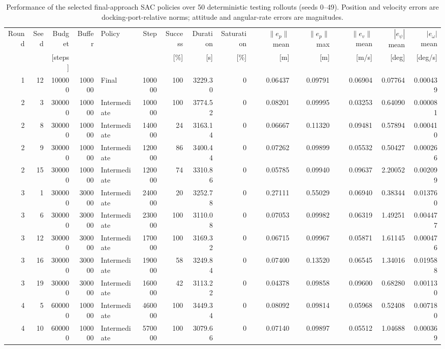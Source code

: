 \begin{table}[t]
\centering
\caption{Performance of the selected final-approach SAC policies over 50 deterministic testing rollouts (seeds 0--49). Position and velocity errors are docking-port-relative norms; attitude and angular-rate errors are magnitudes.}
\label{tab:selected-final-approach-sac-50}
\scriptsize
\setlength{\tabcolsep}{3pt}
\begin{tabular}{rrrrlrrrrrrrrr}
\hline
Round & Seed & Budget & Buffer & Policy & Step & Success & Duration & Saturation & $\|e_p\|$ mean & $\|e_p\|$ max & $\|e_v\|$ mean & $|e_\psi|$ mean & $|e_\omega|$ mean \\
 & & [steps] & & & & [\%] & [s] & [\%] & [m] & [m] & [m/s] & [deg] & [deg/s] \\
\hline
1 & 12 & 100000 & 100000 & Final & 100000 & 100 & 3229.30 & 0 & 0.06437 & 0.09791 & 0.06904 & 0.07764 & 0.000439 \\
2 & 3 & 300000 & 100000 & Intermediate & 100000 & 100 & 3774.52 & 0 & 0.08201 & 0.09995 & 0.03253 & 0.64090 & 0.000081 \\
2 & 8 & 300000 & 100000 & Intermediate & 140000 & 24 & 3163.14 & 0 & 0.06667 & 0.11320 & 0.09481 & 0.57894 & 0.000410 \\
2 & 9 & 300000 & 100000 & Intermediate & 120000 & 86 & 3400.44 & 0 & 0.07262 & 0.09899 & 0.05532 & 0.50427 & 0.000266 \\
2 & 15 & 300000 & 100000 & Intermediate & 120000 & 74 & 3310.86 & 0 & 0.05785 & 0.09940 & 0.09637 & 2.20052 & 0.002099 \\
3 & 1 & 300000 & 300000 & Intermediate & 240000 & 20 & 3252.78 & 0 & 0.27111 & 0.55029 & 0.06940 & 0.38344 & 0.013760 \\
3 & 6 & 300000 & 300000 & Intermediate & 230000 & 100 & 3110.08 & 0 & 0.07053 & 0.09982 & 0.06319 & 1.49251 & 0.004477 \\
3 & 12 & 300000 & 300000 & Intermediate & 170000 & 100 & 3169.32 & 0 & 0.06715 & 0.09967 & 0.05871 & 1.61145 & 0.000476 \\
3 & 16 & 300000 & 300000 & Intermediate & 190000 & 58 & 3249.84 & 0 & 0.07400 & 0.13520 & 0.06545 & 1.34016 & 0.019588 \\
3 & 19 & 300000 & 300000 & Intermediate & 160000 & 42 & 3113.22 & 0 & 0.04378 & 0.09858 & 0.09600 & 0.68280 & 0.001130 \\
4 & 5 & 600000 & 100000 & Intermediate & 460000 & 100 & 3449.34 & 0 & 0.08092 & 0.09814 & 0.05968 & 0.52408 & 0.007180 \\
4 & 10 & 600000 & 100000 & Intermediate & 570000 & 100 & 3079.66 & 0 & 0.07140 & 0.09897 & 0.05512 & 1.04688 & 0.000369 \\

\end{tabular}
\end{table}
